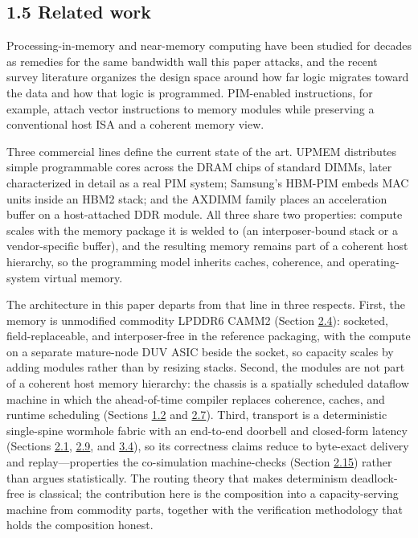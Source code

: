 \documentclass[12pt,onecolumn]{article}
\begin{document}
\subsection*{1.5 Related work}\label{sec:1.5}

Processing-in-memory and near-memory computing have been studied for decades as remedies for the same bandwidth wall this paper attacks\cite{1}, and the recent survey literature organizes the design space around how far logic migrates toward the data and how that logic is programmed\cite{35}. PIM-enabled instructions, for example, attach vector instructions to memory modules while preserving a conventional host ISA and a coherent memory view\cite{36}.

Three commercial lines define the current state of the art. UPMEM distributes simple programmable cores across the DRAM chips of standard DIMMs\cite{31}, later characterized in detail as a real PIM system\cite{37}; Samsung's HBM-PIM embeds MAC units inside an HBM2 stack\cite{32,33}; and the AXDIMM family places an acceleration buffer on a host-attached DDR module\cite{34}. All three share two properties: compute scales with the memory package it is welded to (an interposer-bound stack or a vendor-specific buffer), and the resulting memory remains part of a coherent host hierarchy, so the programming model inherits caches, coherence, and operating-system virtual memory.

The architecture in this paper departs from that line in three respects. First, the memory is unmodified commodity LPDDR6 CAMM2 (Section \hyperref[sec:2.4]{2.4}): socketed, field-replaceable, and interposer-free in the reference packaging, with the compute on a separate mature-node DUV ASIC beside the socket, so capacity scales by adding modules rather than by resizing stacks. Second, the modules are not part of a coherent host memory hierarchy: the chassis is a spatially scheduled dataflow machine in which the ahead-of-time compiler replaces coherence, caches, and runtime scheduling (Sections \hyperref[sec:1.2]{1.2} and \hyperref[sec:2.7]{2.7}). Third, transport is a deterministic single-spine wormhole fabric with an end-to-end doorbell and closed-form latency (Sections \hyperref[sec:2.1]{2.1}, \hyperref[sec:2.9]{2.9}, and \hyperref[sec:3.4]{3.4}), so its correctness claims reduce to byte-exact delivery and replay---properties the co-simulation machine-checks (Section \hyperref[sec:2.15]{2.15}) rather than argues statistically. The routing theory that makes determinism deadlock-free is classical\cite{13,14}; the contribution here is the composition into a capacity-serving machine from commodity parts, together with the verification methodology that holds the composition honest.
\end{document}
